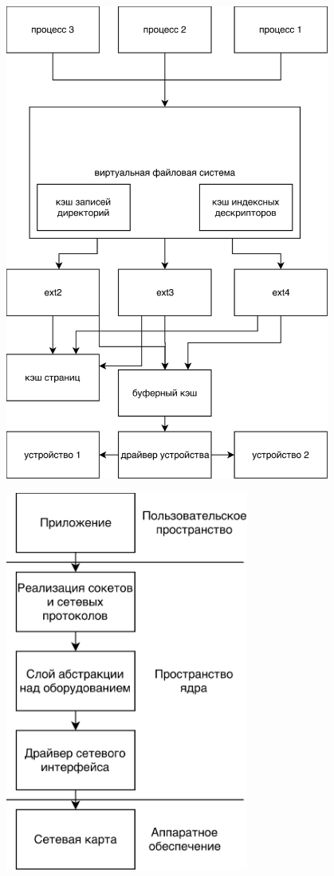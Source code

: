 \documentclass{gost7.32-2001}
\begin{document}
\hfill
\vfill
\includegraphics[width=0.8\textwidth]{images/vfsscheme.png}
\hfill
\vfill


\hfill
\vfill
\includegraphics[width=0.6\textwidth]{images/networking.png}
\hfill
\vfill
\end{document}
